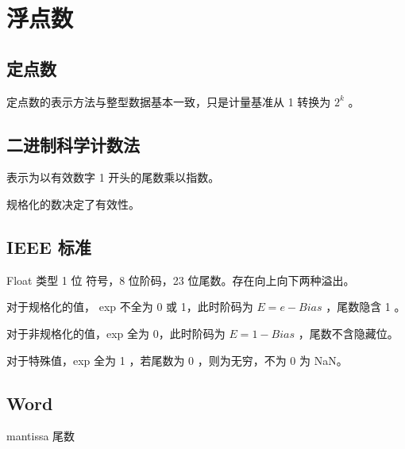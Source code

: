 \documentclass[cn,11pt,chinese,black,simple]{../elegantbook}
\begin{document}
\fi 
\def\chapname{03float}

\chapter{浮点数}

\section{定点数}

定点数的表示方法与整型数据基本一致，只是计量基准从 1 转换为 \(2^k\) 。

\section{二进制科学计数法}

表示为以有效数字 1 开头的尾数乘以指数。

规格化的数决定了有效性。

\section{IEEE 标准}

Float 类型 1 位 符号，8 位阶码，23 位尾数。存在向上向下两种溢出。

对于规格化的值， exp 不全为 0 或 1，此时阶码为 \(E = e - Bias\) ，尾数隐含 1 。

对于非规格化的值，exp 全为 0，此时阶码为 \(E = 1 - Bias\) ，尾数不含隐藏位。

对于特殊值，exp 全为 1 ，若尾数为 0 ，则为无穷，不为 0 为 NaN。

\section*{Word}

mantissa 尾数


\let\chapname\undefined
\ifx\mainclass\undefined
\end{document}
